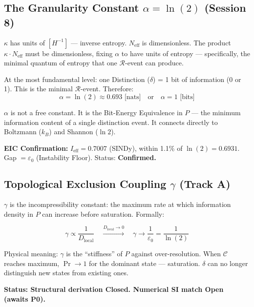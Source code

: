 \documentclass[12pt, a4paper]{article}
\begin{document}
\subsection{The Granularity Constant $\alpha = \ln(2)$ (Session 8)}

\begin{derivedbox}[title={$\alpha$ Derived from $\delta$-Bit Equivalence}]
$\kappa$ has units of $[H^{-1}]$ --- inverse entropy. $N_{\mathrm{eff}}$ is dimensionless.
The product $\kappa\cdot N_{\mathrm{eff}}$ must be dimensionless, fixing $\alpha$ to have
units of entropy --- specifically, the minimal quantum of entropy that one $\mathcal{R}$-event
can produce.

At the most fundamental level: one Distinction ($\delta$) = 1 bit of information (0 or 1).
This is the minimal $\mathcal{R}$-event. Therefore:
\[
  \alpha = \ln(2) \approx 0.693 \text{ [nats]} \quad\text{or}\quad \alpha = 1 \text{ [bits]}
\]

$\alpha$ is not a free constant. It is the Bit-Energy Equivalence in $P$ --- the minimum
information content of a single distinction event. It connects directly to Boltzmann ($k_B$)
and Shannon ($\ln 2$).

\textbf{EIC Confirmation:} $I_{\mathrm{eff}} = 0.7007$ (SINDy), within 1.1\% of
$\ln(2) = 0.6931$. Gap $= \varepsilon_0$ (Instability Floor). Status: \textbf{Confirmed.}
\end{derivedbox}

\subsection{Topological Exclusion Coupling $\gamma$ (Track A)}

\begin{derivedbox}[title={$\gamma$ --- Upper Bound on Information Density in $P$}]
$\gamma$ is the incompressibility constant: the maximum rate at which information density
in $P$ can increase before saturation. Formally:

\[
  \gamma \propto \frac{1}{D_{\mathrm{local}}} \quad\xrightarrow{D_{\mathrm{local}}\to 0}\quad
  \gamma \to \frac{1}{\varepsilon_0} = \frac{1}{\ln(2)}
\]

Physical meaning: $\gamma$ is the ``stiffness'' of $P$ against over-resolution. When
$\mathcal{C}$ reaches maximum, $\Pr \to 1$ for the dominant state --- saturation.
$\delta$ can no longer distinguish new states from existing ones.

\textbf{Status: Structural derivation Closed. Numerical SI match Open (awaits P0).}
\end{derivedbox}
\end{document}
